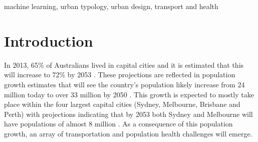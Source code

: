 \documentclass[final,3p,times,authoryear]{elsarticle}
\begin{document}
\begin{frontmatter}
\begin{abstract}
\end{abstract}

\begin{keyword}
machine learning, urban typology, urban design, transport and health



\end{keyword}

\end{frontmatter}









\section{Introduction}\label{sec:introduction}



 
In 2013, 65\% of Australians lived in capital cities and it is estimated that this will increase to 72\% by 2053  \citep{ABS2008}. These projections are reflected in population growth estimates that will see the country’s population likely increase from 24 million today to over 33 million by 2050  \citep{ABS2008}. This growth is expected to mostly take place within the four largest capital cities (Sydney, Melbourne, Brisbane and Perth) with projections indicating that by 2053 both Sydney and Melbourne will have populations of almost 8 million  \citep{CommonwealthofAustralia2010}. As a consequence of this population growth, an array of transportation and population health challenges will emerge.
\end{document}

